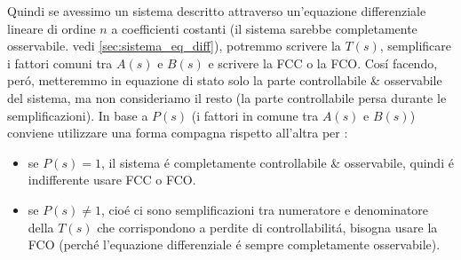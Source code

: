 \documentclass[../main.tex]{subfiles}
\begin{document}
\begin{itemize}
				Quindi se avessimo un sistema descritto attraverso un'equazione differenziale lineare di ordine $ n $ a coefficienti costanti (il sistema sarebbe completamente osservabile. vedi \ref{sec:sistema_eq_diff}), potremmo scrivere la $ T(s) $, semplificare i fattori comuni tra $ A(s) $ e $ B(s) $ e scrivere la FCC o la FCO. Cos\'i facendo, per\'o, metteremmo in equazione di stato solo la parte controllabile \& osservabile del sistema, ma non consideriamo il resto (la parte controllabile persa durante le semplificazioni). In base a $ P(s) $ (i fattori in comune tra $ A(s) $ e $ B(s) $) conviene utilizzare una forma compagna rispetto all'altra per :
				\begin{itemize}
					\item 
						se $ P(s) = 1 $, il sistema \'e completamente controllabile \& osservabile, quindi \'e indifferente usare FCC o FCO.
					\item 
						se $ P(s) \neq 1 $, cio\'e ci sono semplificazioni tra numeratore e denominatore della $ T(s) $ che corrispondono a perdite di controllabilit\'a, bisogna usare la FCO (perch\'e l'equazione differenziale \'e sempre completamente osservabile).
				\end{itemize}
		\end{itemize}
\end{document}
